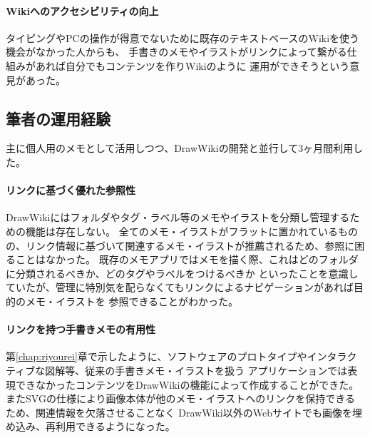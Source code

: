 \paragraph*{Wikiへのアクセシビリティの向上}
\label{tegakiuser}
タイピングやPCの操作が得意でないために既存のテキストベースのWikiを使う機会がなかった人からも、
手書きのメモやイラストがリンクによって繋がる仕組みがあれば自分でもコンテンツを作りWikiのように
運用ができそうという意見があった。

\subsection{筆者の運用経験}
主に個人用のメモとして活用しつつ、DrawWikiの開発と並行して3ヶ月間利用した。

\paragraph*{リンクに基づく優れた参照性}
DrawWikiにはフォルダやタグ・ラベル等のメモやイラストを分類し管理するための機能は存在しない。
全てのメモ・イラストがフラットに置かれているものの、リンク情報に基づいて関連するメモ・イラストが推薦されるため、参照に困ることはなかった。
既存のメモアプリではメモを描く際、これはどのフォルダに分類されるべきか、どのタグやラベルをつけるべきか
といったことを意識していたが、管理に特別気を配らなくてもリンクによるナビゲーションがあれば目的のメモ・イラストを
参照できることがわかった。

\paragraph*{リンクを持つ手書きメモの有用性}
第\ref{chap:riyourei}章で示したように、ソフトウェアのプロトタイプやインタラクティブな図解等、従来の手書きメモ・イラストを扱う
アプリケーションでは表現できなかったコンテンツをDrawWikiの機能によって作成することができた。
またSVGの仕様により画像本体が他のメモ・イラストへのリンクを保持できるため、関連情報を欠落させることなく
DrawWiki以外のWebサイトでも画像を埋め込み、再利用できるようになった。


